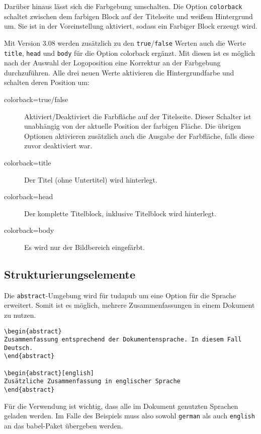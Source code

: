 \documentclass[
	german,%
	accentcolor=9c,%
]{tudapub}
\newcommand*{\code}[1]{\texttt{#1}}
\newcommand*{\pkg}[1]{\textsf{#1}}
\newcommand*{\cls}[1]{\textsf{#1}}
\begin{document}
Darüber hinaus lässt sich die Farbgebung umschalten.
Die Option \code{colorback} schaltet zwischen dem farbigen Block auf der Titelseite und weißem Hintergrund um. Sie ist in der Voreinstellung aktiviert, sodass ein Farbiger Block erzeugt wird.

Mit Version 3.08 werden zusätzlich zu den \code{true}/\code{false} Werten auch die Werte \code{title}, \code{head} und \code{body} für die Option colorback ergänzt.
Mit diesen ist es möglich nach der Auswahl der Logoposition eine Korrektur an der Farbgebung durchzuführen. Alle drei neuen Werte aktivieren die Hintergrundfarbe und schalten deren Position um:
\begin{description}
	\item[colorback=true/false] Aktiviert/Deaktiviert die Farbfläche auf der Titelseite. Dieser Schalter ist unabhängig von der aktuelle Position der farbigen Fläche. Die übrigen Optionen aktivieren zusätzlich auch die Ausgabe der Farbfläche, falls diese zuvor deaktiviert war.
	\item[colorback=title] Der Titel (ohne Untertitel) wird hinterlegt.
	\item[colorback=head] Der komplette Titelblock, inklusive Titelblock wird hinterlegt.
	\item[colorback=body] Es wird nur der Bildbereich eingefärbt.
\end{description}

\subsection{Strukturierungselemente}
Die \code{abstract}-Umgebung wird für \cls{tudapub} um eine Option für die Sprache erweitert. Somit ist es möglich, mehrere Zusammenfassungen in einem Dokument zu nutzen.

\begin{verbatim}
\begin{abstract}
Zusammenfassung entsprechend der Dokumentensprache. In diesem Fall Deutsch.
\end{abstract}

\begin{abstract}[english]
Zusätzliche Zusammenfassung in englischer Sprache
\end{abstract}
\end{verbatim}

Für die Verwendung ist wichtig, dass alle im Dokument genutzten Sprachen geladen werden. Im Falle des Beispiels muss also sowohl \code{german} als auch \code{english} an das \pkg{babel}-Paket übergeben werden.
\end{document}
